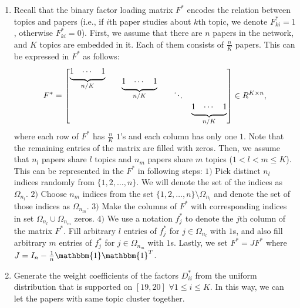 \documentclass[AMS,STIX1COL]{WileyNJD-v2}
\newcommand{\block}[1]{
  \underbrace{\begin{matrix}1 & \cdots & 1\end{matrix}}_{#1}
}
\begin{document}
{\begin{enumerate}
    \item Recall that the binary factor loading matrix $F^*$ encodes the relation between topics and papers
        (i.e., if $i$th paper studies about $k$th topic, we denote $F^*_{ki}=1$, otherwise $F^*_{ki}=0$).
        First, we assume that there are $n$ papers in the network, and $K$ topics are embedded in it.
        Each of them consists of $\frac{n}{K}$ papers.
        This can be expressed in $F^*$ as follows:
        \[
            F^* =
               \begin{bmatrix}
                 \smash[b]{\block{n/K}} \\
                 && \smash[b]{\block{n/K}} \\
                 &&&& \ddots \\
                 &&&&& \block{n/K}
                \end{bmatrix}
              \in R^{K \times n},
        \]
        where each row of $F^*$ has $\frac{n}{K}$ $1$'s and each column has only one $1$.
        Note that the remaining entries of the matrix are filled with zeros.
        Then, we assume that $n_{l}$ papers share $l$ topics and $n_{m}$ papers share $m$ topics ($1 < l < m \leq K$).
        This can be represented in the $F^*$ in following steps:
        $1)$ Pick distinct $n_{l}$ indices randomly from $\{1,2,\dots,n\}$.
        We will denote the set of the indices as $\Omega_{n_l}$.
        $2)$ Choose $n_{m}$ indices from the set $\{1,2,\dots,n\}\setminus \Omega_{n_{l}}$ and denote the set of those indices as $\Omega_{n_{m}}$.
        $3)$ Make the columns of $F^*$ with corresponding indices in set $\Omega_{n_{l}} \cup \Omega_{n_{m}}$ zeros.
        $4)$ We use a notation $f^*_j$ to denote the $j$th column of the matrix $F^*$.
        Fill arbitrary $l$ entries of $f^*_j$ for $j \in \Omega_{n_l}$ with $1$s, and also fill arbitrary $m$ entries of $f^*_j$ for $j \in \Omega_{n_m}$ with $1$s.
        Lastly, we set $F^*=JF^*$ where $J=I_{n}-\frac{1}{n}\mathbbm{1}\mathbbm{1}^T$.

    \item Generate the weight coefficients of the factors $D^*_{ii}$ from the uniform distribution that is supported on $[19,20]$ $ \forall 1 \leq i \leq K$.
        In this way, we can let the papers with same topic cluster together.


\end{enumerate}}
\end{document}

